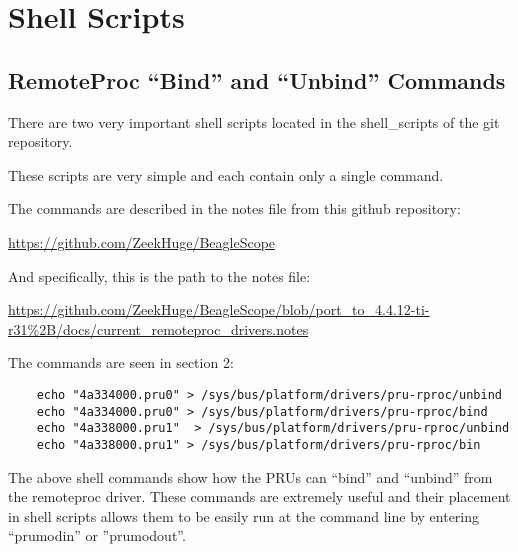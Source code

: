 %
%
%

\chapter{Shell Scripts}

\section{RemoteProc ``Bind'' and ``Unbind'' Commands}

There are two very important shell scripts located in the shell\_scripts of the git repository.

These scripts are very simple and each contain only a single command.

The commands are described in the notes file from this github repository:

\url{https://github.com/ZeekHuge/BeagleScope}

And specifically, this is the path to the notes file:

\url{https://github.com/ZeekHuge/BeagleScope/blob/port_to_4.4.12-ti-r31%2B/docs/current_remoteproc_drivers.notes} 
	
	The commands are seen in section 2:
	
	\begin{verbatim}
	echo "4a334000.pru0" > /sys/bus/platform/drivers/pru-rproc/unbind
	echo "4a334000.pru0" > /sys/bus/platform/drivers/pru-rproc/bind
	echo "4a338000.pru1"  > /sys/bus/platform/drivers/pru-rproc/unbind
	echo "4a338000.pru1" > /sys/bus/platform/drivers/pru-rproc/bin
	\end{verbatim}
	
	The above shell commands show how the PRUs can ``bind'' and ``unbind'' from the remoteproc driver.  These commands are extremely useful and their placement in shell scripts allows them to be easily run at the command line by entering ``prumodin'' or ''prumodout''.
	
